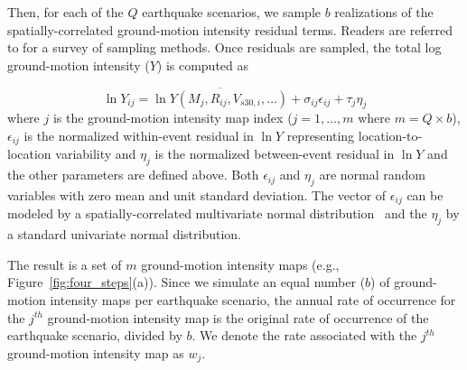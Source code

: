 Then, for each of the $Q$ earthquake scenarios, we sample $b$ realizations of the spatially-correlated ground-motion intensity residual terms. Readers are referred to \cite{han_probabilistic_2012} for a survey of sampling methods.  Once residuals are sampled, the total log ground-motion intensity ($Y$) is computed as 

\begin{equation}
\ln Y_{ij} = \overline{\ln Y (M_j, R_{ij}, V_{s30,i}, \ldots) }+ \sigma_{ij} \epsilon_{ij} + \tau_j \eta_j
\label{eq:GMPEmet}
\end{equation}
where $j$ is the ground-motion intensity map index ($j = 1, \ldots, m$ where $m = Q \times b$), $\epsilon_{ij}$ is the normalized within-event residual in $\ln Y$ representing location-to-location variability and $\eta_j$ is the normalized between-event residual in $\ln Y$ and the other parameters are defined above. Both $\epsilon_{ij}$ and $\eta_j$ are normal random variables with zero mean and unit standard deviation. The vector of $\epsilon_{ij}$ can be modeled by a spatially-correlated multivariate normal distribution~\cite[e.g.,][]{jayaram_correlation_2009} %
and the $\eta_j$ by a standard univariate normal distribution. 

The result is a set of $m$ ground-motion intensity maps (e.g., Figure~\ref{fig:four_steps}{(a)}). Since we simulate an equal number ($b$) of ground-motion intensity maps per earthquake scenario, the annual rate of occurrence for the $j^{th}$ ground-motion intensity map is the original rate of occurrence of the earthquake scenario, divided by $b$. We denote the rate associated with the $j^{th}$ ground-motion intensity map as $w_j$.  

